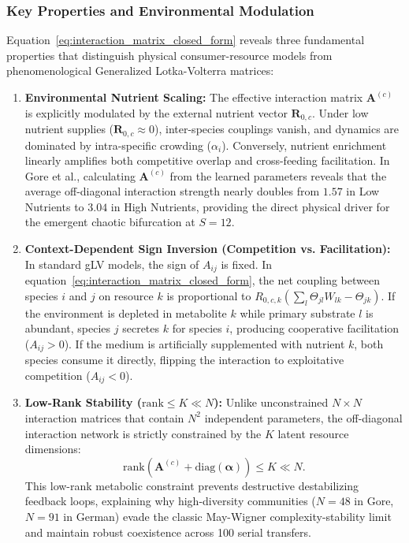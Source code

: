\subsubsection{Key Properties and Environmental Modulation}
Equation~\eqref{eq:interaction_matrix_closed_form} reveals three fundamental properties that distinguish physical consumer-resource models from phenomenological Generalized Lotka-Volterra matrices:
\begin{enumerate}
    \item \textbf{Environmental Nutrient Scaling:} The effective interaction matrix $\mathbf{A}^{(c)}$ is explicitly modulated by the external nutrient vector $\mathbf{R}_{0, c}$. Under low nutrient supplies ($\mathbf{R}_{0, c} \approx 0$), inter-species couplings vanish, and dynamics are dominated by intra-specific crowding ($\alpha_i$). Conversely, nutrient enrichment linearly amplifies both competitive overlap and cross-feeding facilitation. In Gore et al., calculating $\mathbf{A}^{(c)}$ from the learned parameters reveals that the average off-diagonal interaction strength nearly doubles from $1.57$ in Low Nutrients to $3.04$ in High Nutrients, providing the direct physical driver for the emergent chaotic bifurcation at $S=12$.
    \item \textbf{Context-Dependent Sign Inversion (Competition vs. Facilitation):} In standard gLV models, the sign of $A_{ij}$ is fixed. In equation~\eqref{eq:interaction_matrix_closed_form}, the net coupling between species $i$ and $j$ on resource $k$ is proportional to $R_{0, c, k} (\sum_l \Theta_{jl} W_{lk} - \Theta_{jk})$. If the environment is depleted in metabolite $k$ while primary substrate $l$ is abundant, species $j$ secretes $k$ for species $i$, producing cooperative facilitation ($A_{ij} > 0$). If the medium is artificially supplemented with nutrient $k$, both species consume it directly, flipping the interaction to exploitative competition ($A_{ij} < 0$).
    \item \textbf{Low-Rank Stability ($\text{rank} \le K \ll N$):} Unlike unconstrained $N \times N$ interaction matrices that contain $N^2$ independent parameters, the off-diagonal interaction network is strictly constrained by the $K$ latent resource dimensions:
    \begin{equation}
        \text{rank}\left( \mathbf{A}^{(c)} + \text{diag}(\mathbf{\alpha}) \right) \le K \ll N.
    \end{equation}
    This low-rank metabolic constraint prevents destructive destabilizing feedback loops, explaining why high-diversity communities ($N=48$ in Gore, $N=91$ in German) evade the classic May-Wigner complexity-stability limit and maintain robust coexistence across 100 serial transfers.
\end{enumerate}
